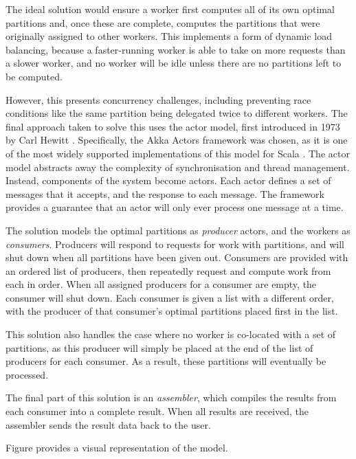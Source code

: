 The ideal solution would ensure a worker first computes all of its own optimal partitions and, once these are complete, computes the partitions that were originally assigned to other workers. This implements a form of dynamic load balancing, because a faster-running worker is able to take on more requests than a slower worker, and no worker will be idle unless there are no partitions left to be computed.

However, this presents concurrency challenges, including preventing race conditions like the same partition being delegated twice to different workers. The final approach taken to solve this uses the actor model, first introduced in 1973 by Carl Hewitt \cite{hewitt1973session}. Specifically, the Akka Actors framework was chosen, as it is one of the most widely supported implementations of this model for Scala . The actor model abstracts away the complexity of synchronisation and thread management. Instead, components of the system become actors. Each actor defines a set of messages that it accepts, and the response to each message. The framework provides a guarantee that an actor will only ever process one message at a time.

The solution models the optimal partitions as \textit{producer} actors, and the workers as \textit{consumers}. Producers will respond to requests for work with partitions, and will shut down when all partitions have been given out. Consumers are provided with an ordered list of producers, then repeatedly request and compute work from each in order. When all assigned producers for a consumer are empty, the consumer will shut down. Each consumer is given a list with a different order, with the producer of that consumer's optimal partitions placed first in the list. 

This solution also handles the case where no worker is co-located with a set of partitions, as this producer will simply be placed at the end of the list of producers for each consumer. As a result, these partitions will eventually be processed.

The final part of this solution is an \textit{assembler}, which compiles the results from each consumer into a complete result. When all results are received, the assembler sends the result data back to the user.

Figure  provides a visual representation of the model.


